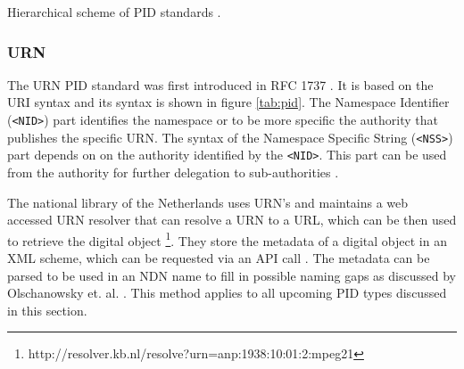 \begin {table}[H]
\caption {Hierarchical scheme of PID standards \cite{icn-bd}.} \label{tab:pid} 
\begin{center}
\end{center}
\end {table}



\subsubsection{URN}
The URN PID standard was first introduced in RFC 1737 \cite{rfc1737}. It is based on the URI syntax and its syntax is shown in figure \ref{tab:pid}. The Namespace Identifier (\texttt{\textless NID\textgreater}) part identifies the namespace or to be more specific the authority that publishes the specific URN.
The syntax of the Namespace Specific String (\texttt{\textless NSS\textgreater}) part depends on on the authority identified by the \texttt{\textless NID\textgreater}. This part can be used from the authority for further delegation to sub-authorities \cite{icn-bd}.

The national library of the Netherlands uses URN's and maintains a web accessed URN resolver that can resolve a URN to a URL, which can be then used to retrieve the digital object \footnote{http://resolver.kb.nl/resolve?urn=anp:1938:10:01:2:mpeg21}.
They store the metadata of a digital object in an XML scheme, which can be requested via an API call \cite{kb-urn}. The metadata can be parsed to be used in an NDN name to fill in possible naming gaps as discussed by Olschanowsky et. al. \cite{ndn-clim}. This method applies to all upcoming PID types discussed in this section.

